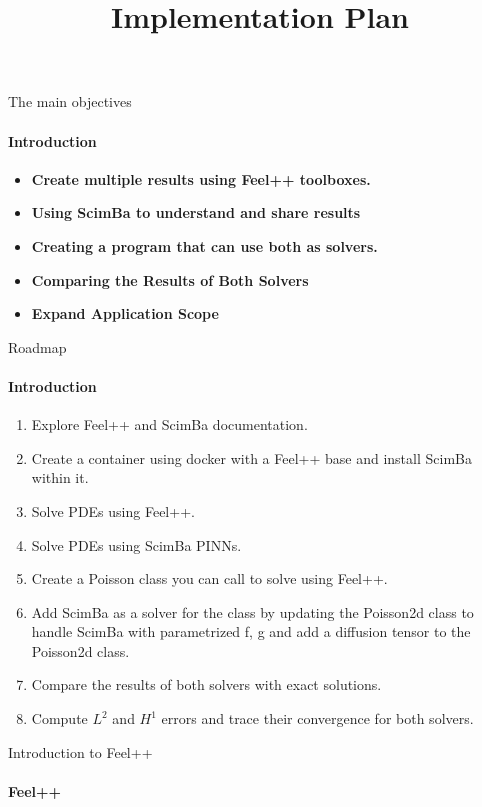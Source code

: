 \documentclass{beamer}
\begin{document}
\begin{frame}{The main objectives}
\framesubtitle{Introduction}

\begin{itemize}
    \item \textbf{Create multiple results using Feel++ toolboxes.}
    \item \textbf{Using ScimBa to understand and share results}
    \item \textbf{Creating a program that can use both as solvers.}
    \item \textbf{Comparing the Results of Both Solvers}
    \item \textbf{Expand Application Scope}
\end{itemize}
\end{frame}
\title{Implementation Plan}

\begin{frame}{Roadmap}
\framesubtitle{Introduction}

\begin{enumerate}
    \item Explore Feel++ and ScimBa documentation.
    \item Create a container using docker with a Feel++ base and install ScimBa within it.
    \item Solve PDEs using Feel++.
    \item Solve PDEs using ScimBa PINNs.
    \item Create a Poisson class you can call to solve using Feel++.
    \item Add ScimBa as a solver for the class by updating the Poisson2d class to handle ScimBa with parametrized f, g and add a diffusion tensor to the Poisson2d class.
    \item Compare the results of both solvers with exact solutions.
    \item Compute \( L^2\) and \( H^1 \) errors and trace their convergence for both solvers.
\end{enumerate}
\end{frame}
\begin{frame}[plain]{Introduction to Feel++}
\framesubtitle{Feel++}
\begin{center}
\end{center}

\end{frame}
\end{document}
